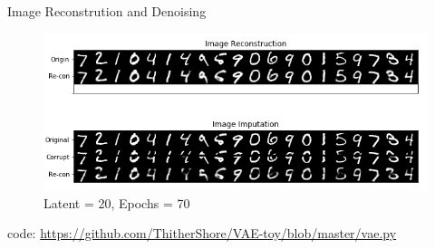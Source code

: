 \documentclass{beamer}
\begin{document}
\begin{frame}{Image Reconstrution and Denoising}
\begin{figure}[htbp]
\includegraphics[width=0.95\columnwidth]{fig/i_re_latent_20_ep_70.png}
\caption{Latent = 20, Epochs = 70}
\end{figure}
\begin{center}
\textcolor[RGB]{185 181 205}{\small code: \url{https://github.com/ThitherShore/VAE-toy/blob/master/vae.py}}
\end{center}
\end{frame}
\end{document}
